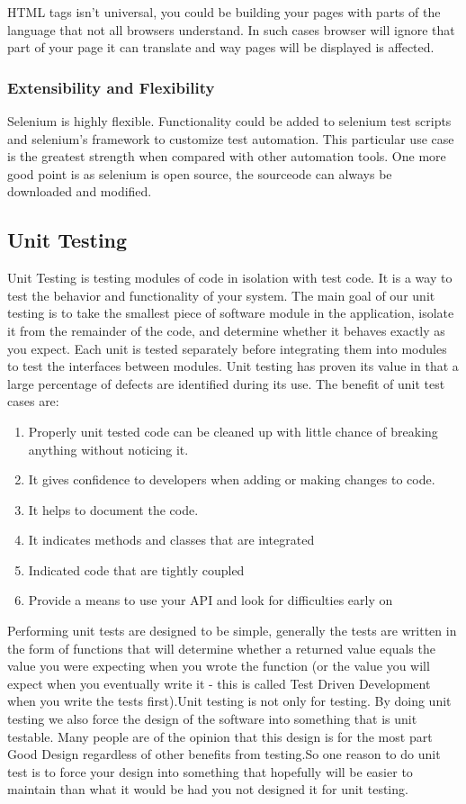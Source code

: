 \documentclass[article,type=msc,colorback,accentcolor=tud9c,twoside,11pt]{tudthesis}
\begin{document}
HTML tags isn't universal, you could be building your pages with parts of the language that not all browsers understand. In such cases browser will ignore that part of your page it can translate and way pages will be displayed is affected.

\subsubsection{Extensibility and Flexibility}
Selenium is highly flexible. Functionality could be added to selenium test scripts and selenium's framework to customize test automation. This particular use case is the greatest strength when compared with other automation tools. One more good point is as selenium is open source, the sourceode can always be downloaded and modified.

\subsection{Unit Testing}
Unit Testing\cite{EffectivnessofUnitTest} is testing modules of code in isolation with test code. It is a way to test the behavior and functionality of your system. The main goal of our unit testing is to take the smallest piece of software module in the application, isolate it from the remainder of the code, and determine whether it behaves exactly as you expect. Each unit is tested separately before integrating them into modules to test the interfaces between modules. Unit testing has proven its value in that a large percentage of defects are identified during its use. The benefit of unit test cases are:
\begin{enumerate}
	\item Properly unit tested code can be cleaned up with little chance of breaking anything without noticing it.
	\item It gives confidence to developers when adding or making changes to code.
	\item It helps to document the code.
	\item It indicates methods and classes that are integrated 
	\item Indicated code that are tightly coupled
	\item Provide a means to use your API and look for difficulties early on 
\end{enumerate}
Performing unit tests are designed to be simple, generally the tests are written in the form of functions that will determine whether a returned value equals the value you were expecting when you wrote the function (or the value you will expect when you eventually write it - this is called Test Driven Development when you write the tests first).Unit testing is not only for testing. By doing unit testing we also force the design of the software into something that is unit testable. Many people are of the opinion that this design is for the most part Good Design regardless of other benefits from testing.So one reason to do unit test is to force your design into something that hopefully will be easier to maintain than what it would be had you not designed it for unit testing.
\end{document}
